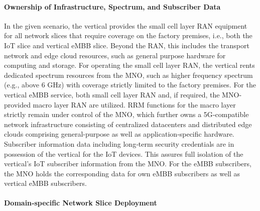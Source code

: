 \documentclass{article}
\begin{document}
\paragraph{Ownership of Infrastructure, Spectrum, and Subscriber Data}
In the given scenario, the vertical provides the small cell layer RAN equipment for all network slices
that require coverage on the factory premises, i.e., both the IoT slice and vertical eMBB slice. Beyond
the RAN, this includes the transport network and edge cloud resources, such as general purpose
hardware for computing and storage. For operating the small cell layer RAN, the vertical rents dedicated spectrum resources from the MNO, such as higher frequency spectrum (e.g., above 6 GHz)
with coverage strictly limited to the factory premises. For the vertical eMBB service, both small cell
layer RAN and, if required, the MNO‐provided macro layer RAN are utilized. RRM functions for the
macro layer strictly remain under control of the MNO, which further owns a 5G‐compatible network infrastructure consisting of centralized datacenters and distributed edge clouds comprising general-purpose as well as application‐specific hardware. Subscriber information data including long‐term
security credentials are in possession of the vertical for the IoT devices. This assures full isolation of
the vertical’s IoT subscriber information from the MNO. For the eMBB subscribers, the MNO holds
the corresponding data for own eMBB subscribers as well as vertical eMBB subscribers.

\paragraph{Domain‐specific Network Slice Deployment}
\end{document}
